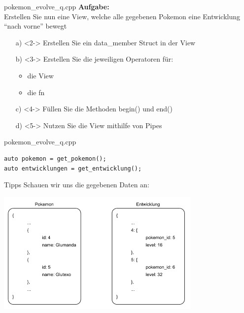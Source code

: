 \begin{frame}{pokemon\_evolve\_q.cpp}
    \textbf{Aufgabe:}\\
    Erstellen Sie nun eine View, welche alle gegebenen Pokemon eine Entwicklung \enquote{nach vorne} bewegt

    \vspace{1.5em}

    \begin{enumerate} %
        \item[a)]<2-> Erstellen Sie ein data\_member Struct in der View
        \item[b)]<3-> Erstellen Sie die jeweiligen Operatoren für:

        \begin{itemize}
            \item die View
            \item die fn
        \end{itemize}
        \item[c)]<4-> Füllen Sie die Methoden begin() und end()
        \item[d)]<5-> Nutzen Sie die View mithilfe von Pipes
    \end{enumerate}
\end{frame}

\begin{frame}[fragile]{pokemon\_evolve\_q.cpp}
    \begin{verbatim}
auto pokemon = get_pokemon();
auto entwicklungen = get_entwicklung();
    \end{verbatim}
\end{frame}

\begin{frame}{Tipps}
    Schauen wir uns die gegebenen Daten an:

    \begin{center}
        \includegraphics[width=0.75\textwidth]{pictures/example_1.pdf}
    \end{center}
\end{frame}

